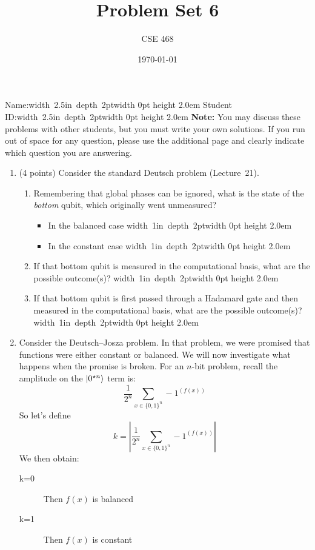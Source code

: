 \documentclass[12pt]{article}
\title{Problem Set 6}
\author{CSE 468}
\date{\today}
\newcommand{\Blank}{\mbox{\hskip 4pt\vrule width 1in depth 2pt}\vrule width 0pt height 2.0em}
\newcommand{\NameBlank}{\mbox{\hskip 4pt\vrule width 2.5in depth 2pt}\vrule width 0pt height 2.0em}
\begin{document}
\maketitle

\noindent Name:\NameBlank{} \newline
\noindent Student ID:\NameBlank{} \newline
\textbf{Note:} You may discuss these problems with other students, but you must write your own solutions. If you run out of space for any question, please use the additional page and clearly indicate which question you are answering.

\begin{enumerate}[font=\bfseries]
    \item (4 points) Consider the standard Deutsch problem (Lecture~21).
    \begin{enumerate}
        \item Remembering that global phases can be ignored, what is the state of the \emph{bottom} qubit, which originally went unmeasured?
        \begin{itemize}
            \item In the balanced case \Blank{}
            \item In the constant case
            \Blank{}
        \end{itemize}
        \item If that bottom qubit is measured in the computational basis, what are the possible outcome(s)? \Blank{}
        \item If that bottom qubit is first passed through a Hadamard gate and then measured in the computational basis, what are the possible outcome(s)?\Blank{}
    \end{enumerate}
    \newpage
     \item Consider the Deutsch--Josza problem. In that problem, we were promised that functions were either constant or balanced. We will now investigate what happens when the promise is broken.  For an $n$-bit problem, recall the amplitude on the $\ket{0^{\star n}}$ term is:
     \[
       \frac{1}{2^n}\sum_{x\in \{0,1\}^{n}} -1^{(f(x))}
     \]
     So let's define
         \[
       k = \left|\frac{1}{2^n}\sum_{x\in \{0,1\}^{n}} -1^{(f(x))}\right|
     \]
     We then obtain:
     \begin{description}
         \item[k=0] Then $f(x)$ is balanced
         \item[k=1] Then $f(x)$ is constant

\end{description}
\end{enumerate}
\end{document}
